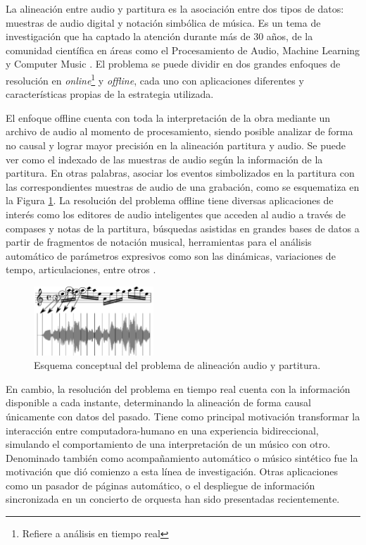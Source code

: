 \documentclass
  [ams,pdfout]%
	{aeslac}
\begin{document}
La alineación entre audio y partitura es la asociación entre dos tipos de datos: muestras de audio digital y notación simbólica de música. Es un tema de investigación que ha captado la atención durante más de 30 años, de la comunidad científica en áreas como el Procesamiento de Audio, Machine Learning y Computer Music \cite{orio2003score}. El problema se puede dividir en dos grandes enfoques de resolución en \textit{online}\footnote{Refiere a análisis en tiempo real} y \textit{offline}, cada uno con aplicaciones diferentes y características propias de la estrategia utilizada.

%
El enfoque offline cuenta con toda la interpretación de la obra mediante un archivo de audio al momento de procesamiento, siendo posible analizar de forma no causal y lograr mayor precisión en la alineación partitura y audio. Se puede ver como el indexado de las muestras de audio según la información de la partitura. En otras palabras, asociar los eventos simbolizados en la partitura con las correspondientes muestras de audio de una grabación, como se esquematiza en la Figura \ref{fig:resultado_alineacion}. La resolución del problema offline tiene diversas aplicaciones de interés como los editores de audio inteligentes que acceden al audio a través de compases y notas de la partitura, búsquedas asistidas en grandes bases de datos a partir de fragmentos de notación musical, herramientas para el análisis automático de parámetros expresivos como son las dinámicas, variaciones de tempo, articulaciones, entre otros \cite{dannenberg2006music}.

\begin{figure}[h!]
\begin{center}
\includegraphics[width=0.4\textwidth]{imagenes/resultado_alineacion} 
\caption{Esquema conceptual del problema de alineación audio y partitura.}
\label{fig:resultado_alineacion}
\end{center}
\end{figure} 

%
En cambio, la resolución del problema en tiempo real cuenta con la información disponible a cada instante, determinando la alineación de forma causal únicamente con datos del pasado. Tiene como principal motivación transformar la interacción entre computadora-humano en una experiencia bidireccional, simulando el comportamiento de una interpretación de un músico con otro. Denominado también como acompañamiento automático o músico sintético\cite{vercoe1984synthetic} fue la motivación que dió comienzo a esta línea de investigación. Otras aplicaciones como un pasador de páginas automático\cite{arzt2008score}, o el despliegue de información sincronizada en un concierto de orquesta\cite{prockup2013orchestral} han sido presentadas recientemente.  
\end{document}
